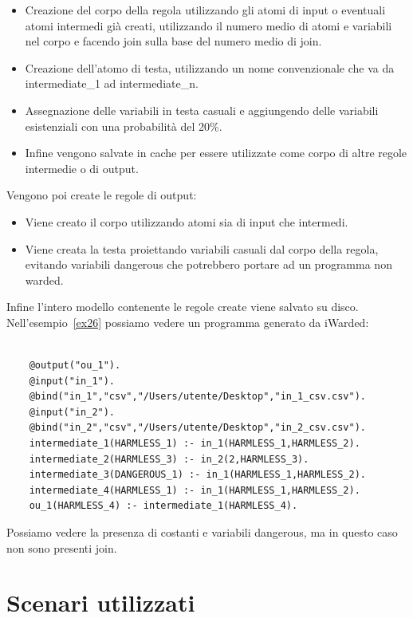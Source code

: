 \begin{itemize}
	\item Creazione del corpo della regola utilizzando gli atomi di input o eventuali atomi intermedi già creati, utilizzando il numero medio di atomi e variabili nel corpo e facendo join sulla base del numero medio di join.
	\item Creazione dell'atomo di testa, utilizzando un nome convenzionale che va da intermediate\_1 ad intermediate\_n.
	\item Assegnazione delle variabili in testa casuali e aggiungendo delle variabili esistenziali con una probabilità del 20\%.
	\item Infine vengono salvate in cache per essere utilizzate come corpo di altre regole intermedie o di output.
\end{itemize}
Vengono poi create le regole di output:
\begin{itemize}
	\item Viene creato il corpo utilizzando atomi sia di input che intermedi.
	\item Viene creata la testa proiettando variabili casuali dal corpo della regola, evitando variabili dangerous che potrebbero portare ad un programma non warded.
\end{itemize}
Infine l'intero modello contenente le regole create viene salvato su disco. \newline
Nell'esempio~\ref{ex26} possiamo vedere un programma generato da iWarded:
\begin{example}\label{ex26}
	\normalfont
	\scriptsize \begin{lstlisting}
	
	@output("ou_1").
	@input("in_1").
	@bind("in_1","csv","/Users/utente/Desktop","in_1_csv.csv").
	@input("in_2").
	@bind("in_2","csv","/Users/utente/Desktop","in_2_csv.csv").
	intermediate_1(HARMLESS_1) :- in_1(HARMLESS_1,HARMLESS_2).
	intermediate_2(HARMLESS_3) :- in_2(2,HARMLESS_3).
	intermediate_3(DANGEROUS_1) :- in_1(HARMLESS_1,HARMLESS_2).
	intermediate_4(HARMLESS_1) :- in_1(HARMLESS_1,HARMLESS_2).
	ou_1(HARMLESS_4) :- intermediate_1(HARMLESS_4).
	\end{lstlisting}
\end{example}
Possiamo vedere la presenza di costanti e variabili dangerous, ma in questo caso non sono presenti join. 

\section{Scenari utilizzati}

